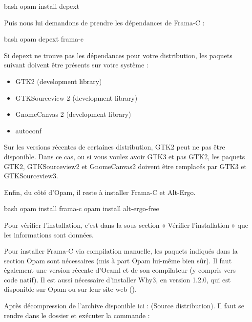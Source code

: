 \begin{CodeBlock}{bash}
opam install depext
\end{CodeBlock}


Puis nous lui demandons de prendre les dépendances de Frama-C :


\begin{CodeBlock}{bash}
opam depext frama-c
\end{CodeBlock}


Si depext ne trouve pas les dépendances pour votre distribution, les paquets
suivant doivent être présents sur votre système :


\begin{itemize}
\item GTK2 (development library)
\item GTKSourceview 2 (development library)
\item GnomeCanvas 2 (development library)
\item autoconf
\end{itemize}

Sur les versions récentes de certaines distribution, GTK2 peut ne pas
être disponible. Dans ce cas, ou si vous voulez avoir GTK3 et pas GTK2,
les paquets GTK2, GTKSourceview2 et GnomeCanvas2 doivent être remplacés
par GTK3 et GTKSourceview3.


Enfin, du côté d'Opam, il reste à installer Frama-C et Alt-Ergo.



\begin{CodeBlock}{bash}
opam install frama-c
opam install alt-ergo-free
\end{CodeBlock}



Pour vérifier l'installation, c'est dans la sous-section « Vérifier l'installation »
que les informations sont données.





Pour installer Frama-C via compilation manuelle, les paquets indiqués dans la
section Opam sont nécessaires (mis à part Opam lui-même bien sûr). Il faut
également une version récente d'Ocaml et de son compilateur (y compris vers
code natif). Il est aussi nécessaire d'installer Why3, en version 1.2.0,
qui est disponible sur Opam ou sur leur site web
().



Après décompression de l'archive disponible ici :
 (Source distribution).
Il faut se rendre dans le dossier et exécuter la commande :



